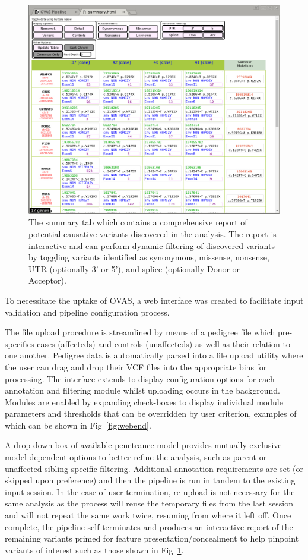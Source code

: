 \documentclass{bioinfo}
\def\app{OVAS}
\begin{document}
\begin{methods}
\begin{figure}[!tpb]
  \centerline{\includegraphics[natwidth=220bp,natheight=190bp]{report_small.jpg}}\caption{The summary tab which contains a comprehensive report of potential causative variants discovered in the analysis. The report is interactive and can perform dynamic filtering of discovered variants by toggling variants identified as synonymous, missense, nonsense, UTR (optionally 3' or 5'), and splice (optionally Donor or Acceptor).}\label{fig:report}
\end{figure}

To necessitate the uptake of \app{}, a web interface was created to facilitate input validation and pipeline configuration process.

The file upload procedure is streamlined by means of a pedigree file which pre-specifies cases (affecteds) and controls (unaffecteds) as well as their relation to one another. Pedigree data is automatically parsed into a file upload utility where the user can drag and drop their VCF files into the appropriate bins for processing. The interface extends to display configuration options for each annotation and filtering module whilst uploading occurs in the background. Modules are enabled by expanding check-boxes to display individual module parameters and thresholds that can be overridden by user criterion, examples of which can be shown in Fig~\ref{fig:webend}. 

A drop-down box of available penetrance model provides mutually-exclusive model-dependent options to better refine the analysis, such as parent or unaffected sibling-specific filtering. Additional annotation requirements are set (or skipped upon preference) and then the pipeline is run in tandem to the existing input session. In the case of user-termination, re-upload is not necessary for the same analysis as the process will reuse the temporary files from the last session and will not repeat the same work twice, resuming from where it left off. Once complete, the pipeline self-terminates and produces an interactive report of the remaining variants primed for feature presentation/concealment to help pinpoint variants of interest such as those shown in Fig~\ref{fig:report}.


\end{methods}
\end{document}
